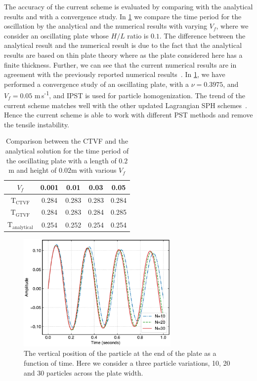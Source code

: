 \documentclass[preprint,12pt]{elsarticle}
\begin{document}
The accuracy of the current scheme is evaluated by comparing with the
analytical results and with a convergence study. In
\cref{table:compare-analytical-with-simulated-h-l-0-1} we compare the time
period for the oscillation by the analytical and the numerical results with
varying $V_f$, where we consider an oscillating plate whose $H/L$ ratio is
$0.1$. The difference between the analytical result and the numerical result
is due to the fact that the analytical results are based on thin plate theory
where as the plate considered here has a finite thickness. Further, we can see
that the current numerical results are in agreement with the previously
reported numerical results~\cite{gray-ed-2001, zhang_hu_adams17}. In
\cref{fig:oscillating:ipst_convergence_plot}, we have performed a convergence
study of an oscillating plate, with a $\nu=0.3975$, and $V_f=0.05$
m\,s\textsuperscript{-1}, and IPST is used for particle homogenization. The trend of
the current scheme matches well with the other updated Lagrangian SPH
schemes~\cite{gray-ed-2001, zhang_hu_adams17}. Hence the current scheme is
able to work with different PST methods and remove the tensile instability.

\begin{table}[!htpb]
\centering
\begin{tabular}{c c c c c}
  \hline
  $V_f$ & 0.001 & 0.01 & 0.03 & 0.05 \\
  \hline
  $\text{T}_{\mathrm{CTVF}}$ & 0.284 & 0.283 & 0.283 & 0.284 \\
  $\text{T}_{\mathrm{GTVF}}$ & 0.284 & 0.283 & 0.284 & 0.285 \\
  $\text{T}_{\mathrm{analytical}}$ & 0.254 & 0.252 & 0.254 & 0.254
\end{tabular}
\caption{Comparison between the CTVF and the analytical solution for the time
  period of the oscillating plate with a length of $0.2$m and height of
  $0.02$m with various $V_f$}
\label{table:compare-analytical-with-simulated-h-l-0-1}
\end{table}
\begin{figure}[!htpb]
  \centering
  \includegraphics[width=0.7\textwidth]{figures/oscillating_plate/ipst_convergence_plot}
  \caption{The vertical position of the particle at the end of the plate as a
    function of time. Here we consider a three particle variations, 10, 20 and
    30 particles across the plate width.}
\label{fig:oscillating:ipst_convergence_plot}
\end{figure}
%
\end{document}

